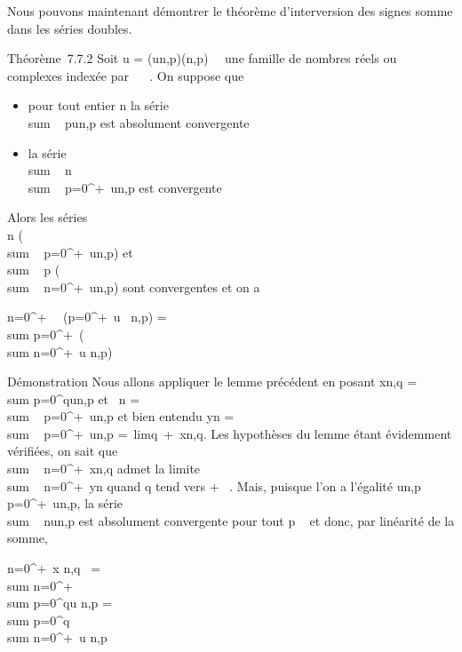 Nous pouvons maintenant démontrer le théorème d'interversion des signes
somme dans les séries doubles.

Théorème~7.7.2 Soit u = (un,p)(n,p)\in{}~\times{}~ une famille
de nombres réels ou complexes indexée par ~ \times {}~. On suppose que

\begin{itemize}
\itemsep1pt\parskip0pt
\item
  pour tout entier n la série
  \\sum ~
  pun,p est absolument convergente
\item
  la série \\sum ~
  n \\sum ~
  p=0^+\infty~\textbar{}un,p\textbar{} est
  convergente
\end{itemize}

Alors les séries \\\sum
 n\left
(\\sum ~
p=0^+\infty~un,p\right ) et
\\sum ~
p\left
(\\sum ~
n=0^+\infty~un,p\right ) sont
convergentes et on a

\sum n=0^+\infty~~\left
(\sum p=0^+\infty~u~
n,p\right ) = \\sum
p=0^+\infty~\left (\\sum
n=0^+\infty~u n,p\right )

Démonstration Nous allons appliquer le lemme précédent en posant
xn,q =\ \\sum
 p=0^qun,p et \alpha~n
= \\sum ~
p=0^+\infty~\textbar{}un,p\textbar{} et bien entendu
yn = \\sum ~
p=0^+\infty~un,p =\
limq\rightarrow~+\infty~xn,q. Les hypothèses du lemme étant
évidemment vérifiées, on sait que
\\sum ~
n=0^+\infty~xn,q admet la limite
\\sum ~
n=0^+\infty~yn quand q tend vers + \infty~. Mais, puisque
l'on a l'égalité
\textbar{}un,p\textbar{}\leq\\\sum
 p=0^+\infty~\textbar{}un,p\textbar{}, la série
\\sum ~
nun,p est absolument convergente pour tout p \in {}~ et
donc, par linéarité de la somme,

\sum n=0^+\infty~x n,q~ =
\\sum
n=0^+\infty~\\sum
p=0^qu n,p = \\sum
p=0^q \\sum
n=0^+\infty~u n,p

